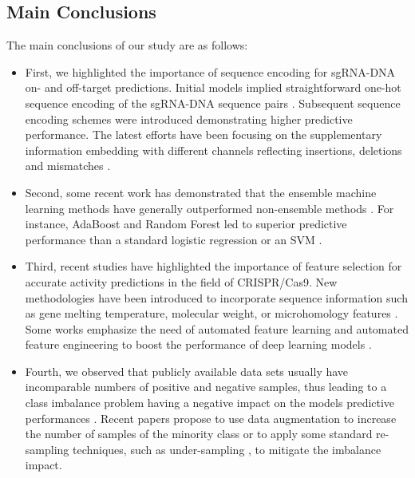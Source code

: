 \documentclass[unnumsec,webpdf,contemporary,large]{oup-authoring-template}
\theoremstyle{thmstyleone}%
\theoremstyle{thmstyletwo}%
\theoremstyle{thmstylethree}%
\begin{document}
\subsection{\textbf{Main Conclusions}}
The main conclusions of our study are as follows:
\begin{itemize}

\item First, we highlighted the importance of sequence encoding for sgRNA-DNA on- and off-target predictions. Initial models implied straightforward one-hot sequence encoding of the sgRNA-DNA sequence pairs \cite{lin2018off}. Subsequent sequence encoding schemes were introduced \cite{charlier2021accurate} demonstrating higher predictive performance. The latest efforts have been focusing on the supplementary information embedding with different channels reflecting insertions, deletions and mismatches \citep{lin2020crispr}. 

\item Second, some recent work has demonstrated that the ensemble machine learning methods have generally outperformed non-ensemble methods \cite{zhang2019synergizing, abadi2017machine}. For instance, AdaBoost \cite{zhang2019synergizing}
and Random Forest \cite{abadi2017machine} led to superior predictive performance than a standard logistic regression or an SVM \cite{fusi2015silico}. %

\item Third, recent studies have highlighted the importance of feature selection for accurate activity predictions in the field of CRISPR/Cas9. New methodologies have been introduced to incorporate sequence information such as gene melting temperature, molecular weight, or microhomology features \cite{wang2019optimized}. Some works emphasize the need of automated feature learning and automated feature engineering to boost the performance of deep learning models \cite{zhang2022effective}.

\item Fourth, we observed that publicly available data sets usually have incomparable numbers of positive and negative samples, thus leading to a class imbalance problem having a negative impact on the models predictive performances \cite{heaton2018ian}. Recent papers propose to use data augmentation to increase the number of samples of the minority class \cite{zhang2020dl} or to apply some standard re-sampling techniques, such as under-sampling \cite{liu2020deep}, to mitigate the imbalance impact.


\end{itemize}
\end{document}
